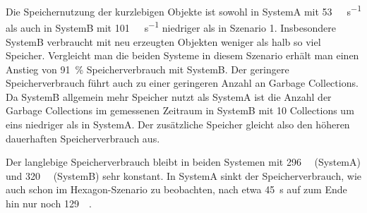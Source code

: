 Die Speichernutzung der kurzlebigen Objekte ist sowohl in SystemA mit \SI{53}{\mega\byte\per\second} als auch in SystemB mit \SI{101}{\mega\byte\per\second} niedriger als in Szenario 1. Insbesondere SystemB verbraucht mit neu erzeugten Objekten weniger als halb so viel Speicher. Vergleicht man die beiden Systeme in diesem Szenario erhält man einen Anstieg von \SI{91}{\percent} Speicherverbrauch mit SystemB. Der geringere Speicherverbrauch führt auch zu einer geringeren Anzahl an Garbage Collections. Da SystemB allgemein mehr Speicher nutzt als SystemA ist die Anzahl der Garbage Collections im gemessenen Zeitraum in SystemB mit 10 Collections um eins niedriger als in SystemA. Der zusätzliche Speicher gleicht also den höheren dauerhaften Speicherverbrauch aus. 

Der langlebige Speicherverbrauch bleibt in beiden Systemen mit \SI{296}{\mega\byte} (SystemA) und \SI{320}{\mega\byte} (SystemB) sehr konstant. In SystemA sinkt der Speicherverbrauch, wie auch schon im Hexagon-Szenario zu beobachten, nach etwa \SI{45}{\second} auf zum Ende hin nur noch \SI{129}{\mega\byte}.